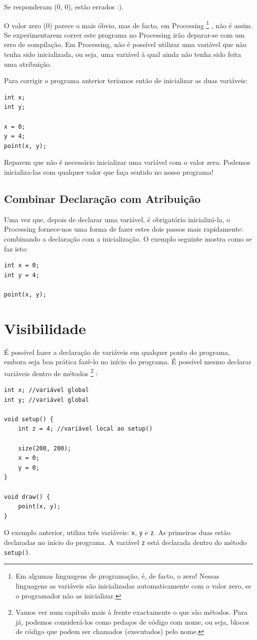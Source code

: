 Se responderam (0, 0), estão errados :).

O valor zero (0) parece o mais óbvio, mas de facto, em Processing%
\footnote{Em algumas linguagens de programação, é, de facto, o zero! Nessas linguagens as variáveis são inicializadas automaticamente com o valor zero, se o programador não as inicializar.}%
, não é assim. Se experimentarem correr este programa no Processing irão deparar-se com um erro de compilação. Em Processing, não é possível utilizar uma variável que não tenha sido inicializada, ou seja, uma variável à qual ainda não tenha sido feita uma atribuição.

Para corrigir o programa anterior teriamos então de inicializar as duas variáveis:
\begin{lstlisting}
int x;
int y;

x = 0;
y = 4;
point(x, y);
\end{lstlisting}
Reparem que não é necessário inicializar uma variável com o valor zero. Podemos inicializa-las com qualquer valor que faça sentido no nosso programa!

\subsection{Combinar Declaração com Atribuição}
Uma vez que, depois de declarar uma variável, é obrigatório inicializá-la, o Processing fornece-nos uma forma de fazer estes dois passos mais rapidamente: combinando a declaração com a inicialização. 
O exemplo seguinte mostra como se faz isto:
\begin{lstlisting}
int x = 0;
int y = 4;

point(x, y);
\end{lstlisting}

\section{Visibilidade}
É possível fazer a declaração de variáveis em qualquer ponto do programa, embora seja boa prática fazê-lo no início do programa.
É possível mesmo declarar variáveis dentro de métodos%
\footnote{Vamos ver num capítulo mais à frente exactamente o que são métodos. Para já, podemos considerá-los como pedaços de código com nome, ou seja, blocos de código que podem ser chamados (executados) pelo nome.}%
:
\begin{lstlisting}
int x; //variável global
int y; //variável global

void setup() {
    int z = 4; //variável local ao setup()
	  
    size(200, 200);
    x = 0;
    y = 0;
}

void draw() {	
    point(x, y);
}
\end{lstlisting}
O exemplo anterior, utiliza três variáveis: \texttt{x}, \texttt{y} e \texttt{z}. As primeiras duas estão declaradas no início do programa. A variável \texttt{z} está declarada dentro do método \texttt{setup()}.

